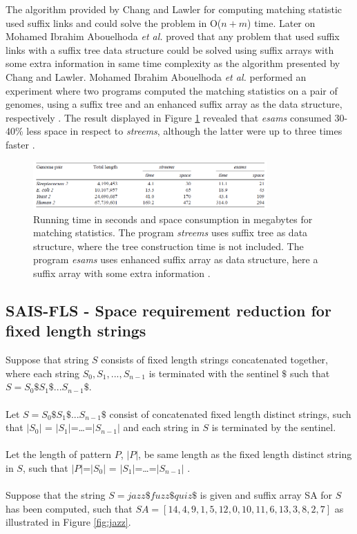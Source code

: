 \documentclass[12pt]{article} %
\begin{document}
The algorithm provided by Chang and Lawler \cite{enchancedsuffix} for computing matching statistic used suffix links and could solve the problem in O($n+m$) time. Later on Mohamed Ibrahim Abouelhoda \emph{et al.} \cite{enchancedsuffix} proved that any problem that used suffix links with a suffix tree data structure could be solved using suffix arrays with some extra information in same time complexity as the algorithm presented by Chang and Lawler\cite{enchancedsuffix}. Mohamed Ibrahim Abouelhoda \emph{et al.} performed an experiment where two programs computed the matching statistics on a pair of genomes, using a suffix tree and an enhanced suffix array as the data structure, respectively \cite{enchancedsuffix}. The result displayed in Figure \ref{fig:matchingtest} revealed that \emph{esams} consumed 30-40\% less space in respect to \emph{streems}, although the latter were up to three times faster \cite{enchancedsuffix}.  

\begin{figure}[H]
    \centering
    \includegraphics[width=0.8\textwidth]{matchingtest}
    \captionsetup{width=0.8
    \textwidth}
    \caption{Running time in seconds and space consumption in megabytes for matching statistics. The program \emph{streems} uses suffix tree as data structure, where the tree construction time is not included. The program \emph{esams} uses enhanced suffix array as data structure, here a suffix array with some extra information \cite{enchancedsuffix}. }
    \label{fig:matchingtest}
\end{figure}

\subsection{SAIS-FLS - Space requirement reduction for fixed length strings}

Suppose that string $S$ consists of fixed length strings concatenated together, where each string $S_0,S_1,...,S_{n-1}$ is terminated with the sentinel $\$$ such that $S=S_0\$S_1\$...S_{n-1}\$ $.
\\ \\
Let $S=S_0\$S_1\$...S_{n-1}\$ $ consist of concatenated fixed length distinct strings, such that $|S_0|$ = $|S_1|$=…=$|S_{n-1}|$ and each string in $S$ is terminated by the sentinel.
\\ \\
Let the length of pattern $P$, $|P|$, be same length as the fixed length distinct string in $S$, such that $|P|$=$|S_0|$ = $|S_1|$=…=$|S_{n-1}|$ .
\\ \\
Suppose that the string $S=jazz\$fuzz\$quiz\$$  is given and suffix array SA for $S$ has been computed, such that $SA=[14,4,9,1,5,12,0,10,11,6,13,3,8,2,7]$ as illustrated in Figure \ref{fig:jazz}.
\end{document}
